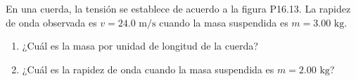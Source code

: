\item En una cuerda, la tensión se establece de acuerdo a la figura P16.13. La rapidez de onda observada es $v = 24.0\text{ m/s}$ cuando la masa suspendida es $m = 3.00\text{ kg}$.
\begin{enumerate}
    \item ¿Cuál es la masa por unidad de longitud de la cuerda?
    \item ¿Cuál es la rapidez de onda cuando la masa suspendida es $m = 2.00\text{ kg}$?
\end{enumerate}
